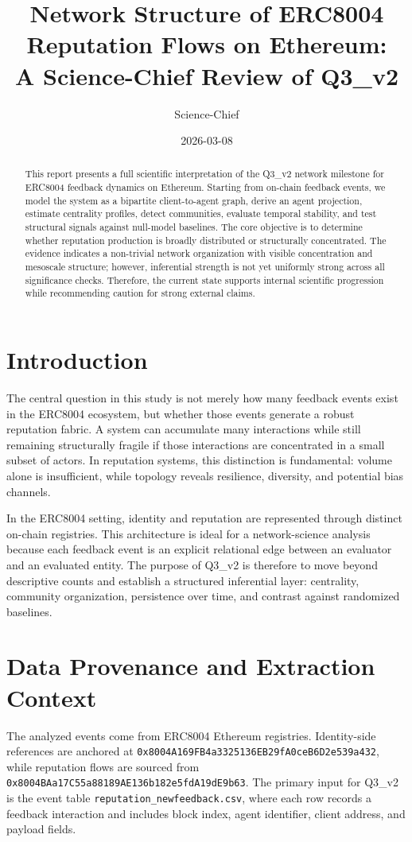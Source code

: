 \documentclass[11pt,a4paper]{article}
\title{Network Structure of ERC8004 Reputation Flows on Ethereum:\\A Science-Chief Review of Q3\_v2}
\author{Science-Chief}
\date{2026-03-08}
\begin{document}
\maketitle

\begin{abstract}
This report presents a full scientific interpretation of the Q3\_v2 network milestone for ERC8004 feedback dynamics on Ethereum. Starting from on-chain feedback events, we model the system as a bipartite client-to-agent graph, derive an agent projection, estimate centrality profiles, detect communities, evaluate temporal stability, and test structural signals against null-model baselines. The core objective is to determine whether reputation production is broadly distributed or structurally concentrated. The evidence indicates a non-trivial network organization with visible concentration and mesoscale structure; however, inferential strength is not yet uniformly strong across all significance checks. Therefore, the current state supports internal scientific progression while recommending caution for strong external claims.
\end{abstract}

\section{Introduction}
The central question in this study is not merely how many feedback events exist in the ERC8004 ecosystem, but whether those events generate a robust reputation fabric. A system can accumulate many interactions while still remaining structurally fragile if those interactions are concentrated in a small subset of actors. In reputation systems, this distinction is fundamental: volume alone is insufficient, while topology reveals resilience, diversity, and potential bias channels.

In the ERC8004 setting, identity and reputation are represented through distinct on-chain registries. This architecture is ideal for a network-science analysis because each feedback event is an explicit relational edge between an evaluator and an evaluated entity. The purpose of Q3\_v2 is therefore to move beyond descriptive counts and establish a structured inferential layer: centrality, community organization, persistence over time, and contrast against randomized baselines.

\section{Data Provenance and Extraction Context}
The analyzed events come from ERC8004 Ethereum registries. Identity-side references are anchored at \texttt{0x8004A169FB4a3325136EB29fA0ceB6D2e539a432}, while reputation flows are sourced from \texttt{0x8004BAa17C55a88189AE136b182e5fdA19dE9b63}. The primary input for Q3\_v2 is the event table \texttt{reputation\_newfeedback.csv}, where each row records a feedback interaction and includes block index, agent identifier, client address, and payload fields.
\end{document}
